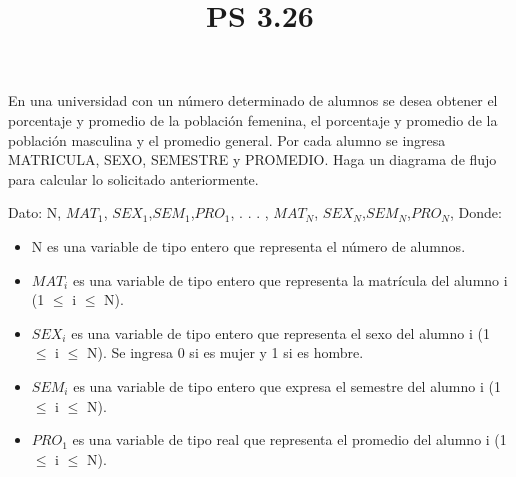 \documentclass[11pt]{amsart}
\title{PS 3.26}
\begin{document}
\maketitle
\noindent En una universidad con un número determinado de alumnos se desea obtener el porcentaje y promedio de la población femenina, el porcentaje y promedio de la población masculina y el promedio general. Por cada alumno se ingresa MATRICULA, SEXO, SEMESTRE y PROMEDIO. Haga un diagrama de flujo para calcular lo solicitado anteriormente.

\noindent Dato:  \hspace{2cm}  N, \(MAT_1\), \(SEX_1\),\(SEM_1\),\(PRO_1\), . . . , \(MAT_N\), \(SEX_N\),\(SEM_N\),\(PRO_N\),
\noindent Donde:

\begin{itemize}
  \item N es una variable de tipo entero que representa el número de alumnos.
  \item \(MAT_i\) es una variable de tipo entero que representa la matrícula del alumno i (1 $ \leq $ i $ \leq $ N).
  \item \(SEX_i\) es una variable de tipo entero que representa el sexo del alumno i (1 $ \leq $ i $ \leq $ N). Se ingresa 0 si es mujer y 1 si es hombre.
  \item \(SEM_i\) es una variable de tipo entero que expresa el semestre del alumno i (1 $ \leq $ i $ \leq $ N).
  \item \(PRO_1\) es una variable de tipo real que representa el promedio del alumno i (1 $ \leq $ i $ \leq $ N).
\end{itemize}
\end{document}

